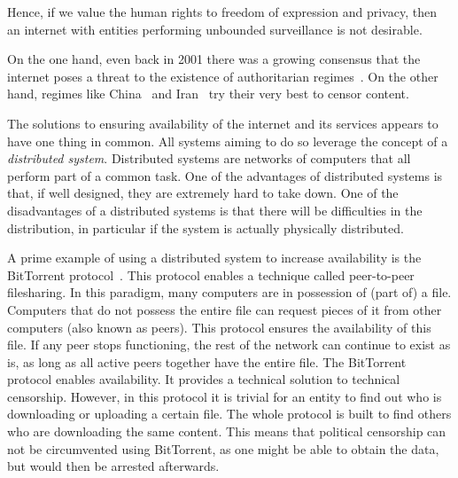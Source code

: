 \documentclass[a4paper,11pt]{book}
\theoremstyle{definition}
\begin{document}
Hence, if we value the human rights to freedom of expression and privacy, then an internet
with entities performing unbounded surveillance is not desirable. 

On the one hand, even back in 2001 there was a growing consensus that the internet poses
a threat to the existence of authoritarian regimes~\cite{kalathil2001internet}. 
On the other hand, regimes like China~\cite{endeshaw2004internet} and Iran~\cite{kimppa2010emancipatory}
try their very best to censor content. 

The solutions to ensuring availability of the internet and its services
appears to have one thing in common. All systems aiming to do so leverage the concept of
a \emph{distributed system}. Distributed systems are networks of computers that all perform part
of a common task. One of the advantages of distributed systems is that, if well designed, they are
extremely hard to take down. One of the disadvantages of a distributed systems is that there will
be difficulties in the distribution, in particular if the system is actually physically
distributed. 

A prime example of using a distributed system to increase availability is the 
BitTorrent protocol~\cite{cohen2008BitTorrent}. This protocol enables a technique
called peer-to-peer filesharing.
In this paradigm, many computers are in possession of (part of) a file. Computers
that do not possess the entire file can request pieces of it from other
computers (also known as peers). This protocol ensures the availability of this
file. If any peer stops functioning, the rest of
the network can continue to exist as is, as long as all active peers together have the
entire file. The BitTorrent protocol enables availability. It provides a technical
solution to technical censorship. However, in this protocol it is trivial for an
entity to find out who is downloading or uploading a certain file. The whole
protocol is built to find others who are downloading the same content. This means 
that political censorship can not be circumvented using BitTorrent, as one might
be able to obtain the data, but would then be arrested afterwards.
\end{document}
